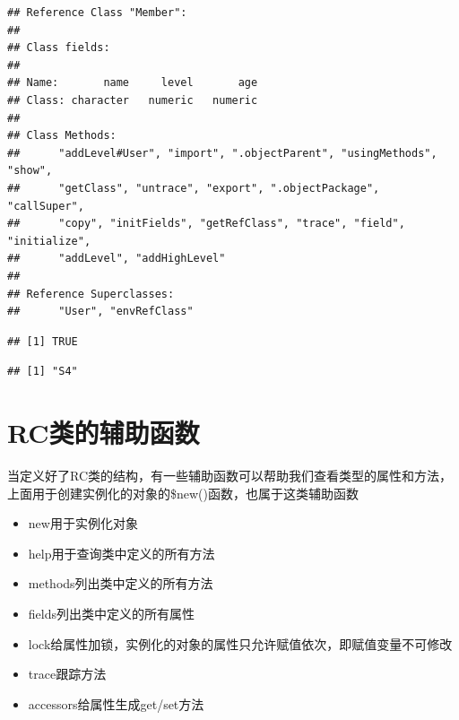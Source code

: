 \documentclass[]{book}
\newenvironment{Shaded}{\begin{snugshade}}{\end{snugshade}}
\newcommand{\KeywordTok}[1]{\textcolor[rgb]{0.13,0.29,0.53}{\textbf{#1}}}
\newcommand{\CommentTok}[1]{\textcolor[rgb]{0.56,0.35,0.01}{\textit{#1}}}
\newcommand{\OperatorTok}[1]{\textcolor[rgb]{0.81,0.36,0.00}{\textbf{#1}}}
\newcommand{\NormalTok}[1]{#1}
\begin{document}
\begin{verbatim}
## Reference Class "Member":
## 
## Class fields:
##                                     
## Name:       name     level       age
## Class: character   numeric   numeric
## 
## Class Methods: 
##      "addLevel#User", "import", ".objectParent", "usingMethods", "show", 
##      "getClass", "untrace", "export", ".objectPackage", "callSuper", 
##      "copy", "initFields", "getRefClass", "trace", "field", "initialize", 
##      "addLevel", "addHighLevel"
## 
## Reference Superclasses: 
##      "User", "envRefClass"
\end{verbatim}

\begin{Shaded}
\end{Shaded}

\begin{verbatim}
## [1] TRUE
\end{verbatim}

\begin{Shaded}
\end{Shaded}

\begin{verbatim}
## [1] "S4"
\end{verbatim}

\section{RC类的辅助函数}\label{rc}

当定义好了RC类的结构，有一些辅助函数可以帮助我们查看类型的属性和方法，上面用于创建实例化的对象的\$new()函数，也属于这类辅助函数

\begin{itemize}
\item
  new用于实例化对象
\item
  help用于查询类中定义的所有方法
\item
  methods列出类中定义的所有方法
\item
  fields列出类中定义的所有属性
\item
  lock给属性加锁，实例化的对象的属性只允许赋值依次，即赋值变量不可修改
\item
  trace跟踪方法
\item
  accessors给属性生成get/set方法
\end{itemize}
\end{document}
